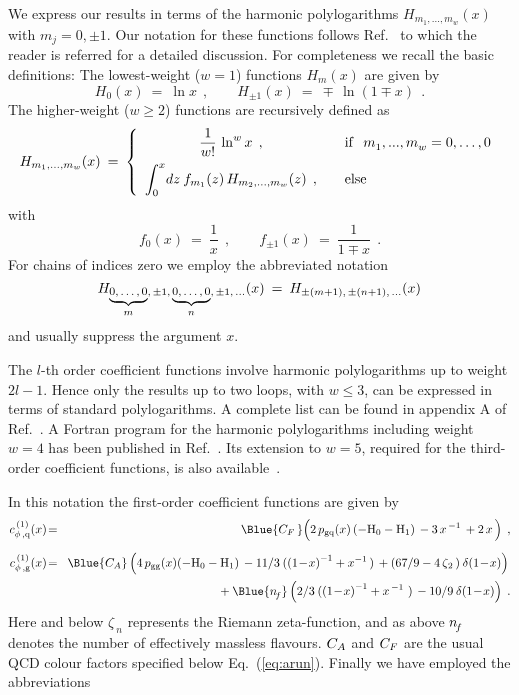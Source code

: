\documentclass[12pt]{article}
\def\colour4colour#1{\Blue{#1}}
\newcommand{\hspn}{{\hspace{-4mm}}}
\newcommand{\beq}{\begin{equation}}
\newcommand{\eeq}{\end{equation}}
\newcommand{\bea}{\begin{eqnarray}}
\newcommand{\eea}{\end{eqnarray}}
\newcommand{\nn}{\nonumber}
\begin{document}
We express our results in terms of the harmonic polylogarithms 
$H_{m_1,...,m_w}(x)$ with $m_j = 0,\pm 1$. Our notation for these functions 
follows Ref.~\cite{Remiddi:1999ew} to which the reader is referred for a 
detailed discussion. 
For completeness we recall the basic definitions: The lowest-weight ($w = 1$) 
functions $H_m(x)$ are given by
%
\beq
\label{eq:hpol1}
  H_0(x)       \: = \: \ln x \:\: , \quad\quad
  H_{\pm 1}(x) \: = \: \mp \, \ln (1 \mp x) \:\: .
\eeq
%
The higher-weight ($w \geq 2$) functions are recursively defined as
%
\beq
\label{eq:hpol2}
  H_{m_1,...,m_w}(x) \: = \:
    \left\{ \begin{array}{cl}
    \displaystyle{ \frac{1}{w!}\,\ln^w x \:\: ,}
       & \quad {\rm if} \:\:\: m^{}_1,...,m^{}_w = 0,\ldots ,0 \\[2ex]
    \displaystyle{ \int_0^x \! dz\: f_{m_1}(z) \, H_{m_2,...,m_w}(z)
       \:\: , } & \quad {\rm else}
    \end{array} \right.
\eeq
%
with
\beq
\label{eq:hpolf}
  f_0(x)       \: = \: \frac{1}{x} \:\: , \quad\quad
  f_{\pm 1}(x) \: = \: \frac{1}{1 \mp x} \:\: .
\eeq
%
For chains of indices zero we employ the abbreviated notation
%
\beq
\label{eq:habbr}
  H_{{\footnotesize \underbrace{0,\ldots ,0}_{\scriptstyle m} },\,
  \pm 1,\, {\footnotesize \underbrace{0,\ldots ,0}_{\scriptstyle n} },
  \, \pm 1,\, \ldots}(x) \: = \: H_{\pm (m+1),\,\pm (n+1),\, \ldots}(x)
\eeq
%
and usually suppress the argument $x$. 

The $l$-th order coefficient functions involve harmonic polylogarithms up to 
weight $2l\!-\!1$. Hence only the results up to two loops, with $w \leq 3$,
can be expressed in terms of standard polylogarithms. A complete list can be 
found in appendix A of Ref.~\cite{Moch:1999eb}. 
A {\sc Fortran} program for the harmonic polylogarithms including weight $w=4$ 
has been published in Ref.~\cite{Gehrmann:2001pz}. Its extension to $w=5$,
required for the third-order coefficient functions, is also available~\cite
{Gehrmann:pc}.

In this notation the first-order coefficient functions are given by
%
\bea
\label{eq:cphiq1}
 c^{\,(1)}_{\rm \phi\, , q}(x) &\! =\! &
        \colour4colour{ \cf\, } 
          \* \Big( 2\, \* \pgq(x)\, \* ( - \H(0) - \H(1) )\,
        - 3\, \* x^{\,-1}\, + 2\, \* x\, \Big)
\:\: ,
\\[2mm]
\label{eq:cphig1}
 c^{\,(1)}_{\rm \phi\, , g}(x) &\! =\! &
        \colour4colour{ \ca } \, \* \Big( 4\, \* \pgg(x) \* (
          - \H(0)
          - \H(1) )\,
          - 11/3\: \* ( \x1^{-1} + x^{-1}\, )\,
          + ( 67/9 - 4\, \* \z2\, )\: \* \delta \x1 \Big)\,
%
\nn \\[0.5mm] & & \mbox{\hspn}
       + \colour4colour{ \nf } \, \* \Big(2/3\: \* ( \x1^{-1} + x^{\,-1}\ )\,
       - 10/9\: \* \delta \x1 \Big)
\:\: .
\eea
%
Here and below $\zeta_{\:\!n}$ represents the Riemann zeta-function, and as 
above ${n^{}_{\! f}}$ denotes the number of effectively massless flavours.  ${C_A}$ and 
${C_F}$ are the usual QCD colour factors specified below Eq.~(\ref{eq:arun}).
Finally we have employed the abbreviations 
\pagebreak
\end{document}
